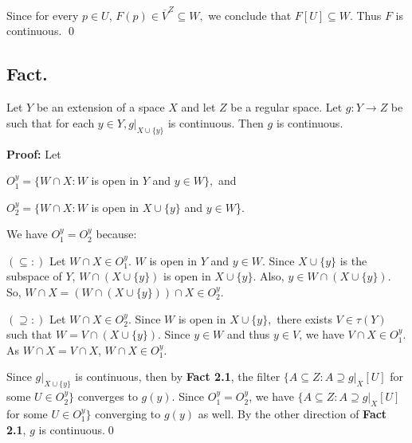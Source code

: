 \documentclass{article}
\begin{document}
		  Since for every $p\in U$, $F(p)\in \overline{V}^Z\subseteq W,$ we conclude that $F[U]\subseteq W.$ Thus $F$ is continuous. \qed










		  \vskip 40pt













		  \subsection{Fact.} Let $Y$ be an extension of a space $X$ and let $Z$ be a regular space. Let $g:Y\rightarrow Z$ be such that for each $y\in Y, g|_{X\cup \{y\}}$ is continuous. Then $g$ is continuous.

		  \vskip 15pt

		  \textbf{Proof: } Let 
		  \begin{center}
		  $O_1^y=\{W\cap X: W$ is open in $Y$ and $y\in W\},$ and 

		  $O_2^y=\{W\cap X: W$ is open in $X\cup \{y\}$ and $y\in W$\}. 
		  \end{center}


		  We have $O_1^y=O_2^y$ because: 

		  \vskip 5pt
		  $(\subseteq:) $ Let $W\cap X \in O_1^y$. $W$ is open in $Y$ and $y\in W.$ Since $X\cup \{y\}$ is the subspace of $Y$, $W\cap (X\cup \{y\})$ is open in $X\cup \{y\}$. Also, $y\in W\cap (X\cup \{y\}).$ So, $W\cap X=\left(W\cap \left(X\cup\{y\}\right)\right)\cap X \in O_2^y$.


		  $(\supseteq:)$ Let $W\cap X\in O_2^y$. Since $W$ is open in $X\cup \{y\},$ there exists $V\in \tau(Y)$ such that $W=V\cap (X\cup \{y\})$. Since $y\in W$ and thus $y\in V$, we have $V\cap X \in O_1^y$. As $W\cap X=V\cap X$, $W\cap X \in O_1^y$. 


		  \vskip 20pt

		  Since $g|_{X\cup \{y\}}$ is continuous, then by \textbf{Fact 2.1}, the filter $\{A\subseteq Z: A \supseteq g|_X [U]$ for some $U\in O_2^y\}$ converges
		  to $g(y)$. Since $O_1^y=O_2^y$, we have $\{A\subseteq Z: A\supseteq g|_X [U]$ for some $U\in O_1^y\}$ converging to $g(y)$ as well. By the other direction of \textbf{Fact 2.1}, $g$ is continuous.\qed
\end{document}
